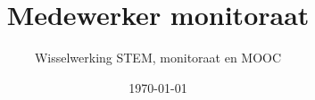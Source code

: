 
\usepackage{graphicx,subfigure}
\title{Medewerker monitoraat} 

\author{Wisselwerking STEM, monitoraat en MOOC}
\date{\today}


\maketitle











